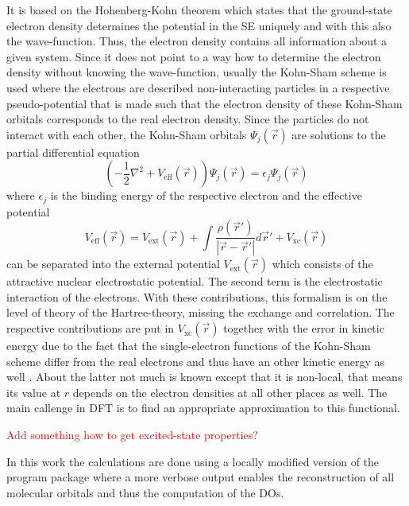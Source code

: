 It is based on the Hohenberg-Kohn theorem \cite{HohenbergKohn} which states that the ground-state electron density determines the potential in the SE uniquely and with this also the wave-function.
Thus, the electron density contains all information about a given system.
Since it does not point to a way how to determine the electron density without knowing the wave-function, usually the Kohn-Sham scheme \cite{KohnSham} is used where the electrons are described non-interacting particles in a respective pseudo-potential that is made such that the electron density of these Kohn-Sham orbitals corresponds to the real electron density.
Since the particles do not interact with each other, the Kohn-Sham orbitals $\Psi_j(\vec{r})$ are solutions to the partial differential equation
\begin{equation}
\left( -\frac 12  \nabla^2 + V_\text{eff}(\vec{r}) \right) \Psi_j(\vec{r})=\epsilon_j \Psi_j(\vec{r})
\end{equation}
where $\epsilon_j$ is the binding energy of the respective electron and the effective potential 
\begin{equation}
V_\text{eff}(\vec{r})=V_\text{ext}(\vec{r})+ \int \frac{\rho(\vec{r}')}{|\vec{r}-\vec{r}'|} d\vec{r}' + V_\text{xc}(\vec{r})
\end{equation}
can be separated into the external potential $V_\text{ext}(\vec{r})$ which consists of the attractive nuclear electrostatic potential.
The second term is the electrostatic interaction of the electrons. 
With these contributions, this formalism is on the level of theory of the Hartree-theory, missing the exchange and correlation.
The respective contributions are put in $V_\text{xc}(\vec{r})$ together with the error in kinetic energy due to the fact that the single-electron functions of the Kohn-Sham scheme differ from the real electrons and thus have an other kinetic energy as well \cite{Holthausen}.
About the latter not much is known except that it is non-local, that means its value at $r$ depends on the electron densities at all other places as well.
The main callenge in DFT is to find an appropriate approximation to this functional.

\textcolor{red}{Add something how to get excited-state properties?}

In this work the calculations are done using a locally modified version of the program package  \cite{nwchem} where a more verbose output enables the reconstruction of all molecular orbitals and thus the computation of the DOs.

